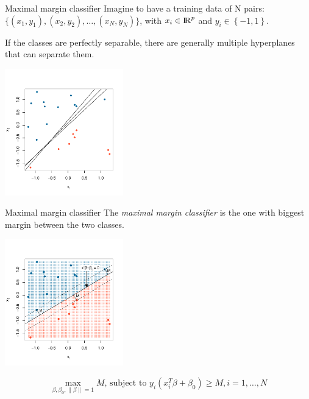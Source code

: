 \documentclass[notes]{beamer}          %
\newcommand{\norm}[1]{\left\lVert#1\right\rVert}
\providecommand{\norm}[1]{\lVert#1\rVert}
\begin{document}
\begin{frame}{Maximal margin classifier}
Imagine to have a training data of N pairs: $\{(x_1, y_1), (x_2, y_2), \dots, (x_N, y_N)\}$, with $x_i \in {\rm I\!R}^p$ and $y_i \in \left\{-1,1 \right\}$.

If the classes are perfectly separable, there are generally multiple hyperplanes that can separate them.

\begin{center}
\includegraphics[height=5.5cm]{figures/week_6/svm_hyperplanes.pdf}
\end{center}

\end{frame}


\begin{frame}{Maximal margin classifier}
The \textit{maximal margin classifier} is the one with biggest margin between the two classes.

\begin{center}
\includegraphics[height=5.5cm]{figures/week_6/svm_maximal_margin_classifier.pdf}
\end{center}

\vspace{-7mm} 

\begin{equation*}
\max_{\beta, \beta_0, \norm{\beta} = 1} M \text{, subject to } y_i(x^T_i \beta + \beta_0) \geq M, i=1, \dots, N
\end{equation*}

\end{frame}
\end{document}
